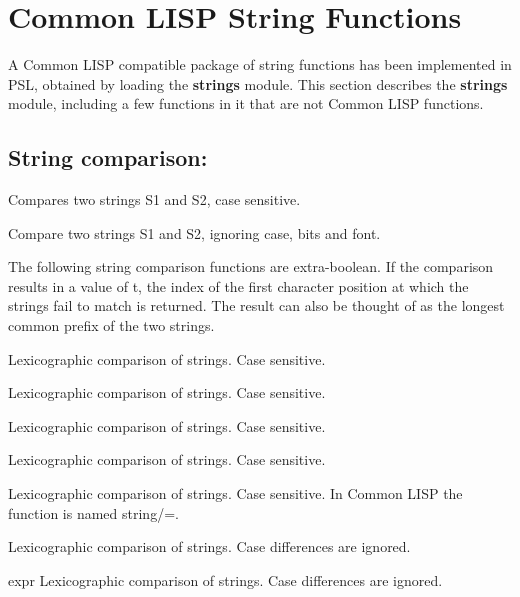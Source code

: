 \section{Common LISP String Functions}

  A  Common LISP compatible package of string functions has been
implemented in PSL, obtained by loading the {\bf strings} module.
This  section  describes the  {\bf strings}  module, including a few
functions in it that are not Common LISP functions.

\subsection{String comparison:}

{    Compares two strings S1 and S2, case sensitive.
}

{    Compare two strings S1 and S2, ignoring case, bits and font.
}					
  
The following string comparison functions  are  extra-boolean.
If  the  comparison  results  in  a value of t, the index of the
first character position at which the strings fail to  match  is
returned.    The  result  can  also be thought of as the longest
common prefix of the two strings.

{    Lexicographic comparison of strings.  Case sensitive.
}

{    Lexicographic comparison of strings.  Case sensitive.
}

 {    Lexicographic comparison of strings. 
Case sensitive. }

 {    Lexicographic comparison of strings. 
Case sensitive. }

 {    Lexicographic comparison of strings. 
Case  sensitive.    In
    Common LISP the function is named string/=.
}

{    Lexicographic  comparison  of strings.  Case differences are ignored.
}

{expr}
{    Lexicographic comparison of strings.  Case  differences  are ignored.
}

